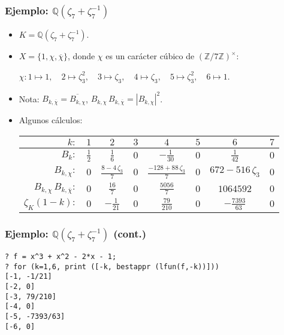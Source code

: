 \documentclass{beamer}
\newcommand{\ZZ}{\mathbb{Z}}
\newcommand{\QQ}{\mathbb{Q}}
\begin{document}
\begin{frame}
  \frametitle{Ejemplo: $\QQ (\zeta_7 + \zeta_7^{-1})$}

  \begin{itemize}
  \item<1-> $K = \QQ (\zeta_7 + \zeta_7^{-1})$.

  \item<2-> $X = \{ 1, \chi, \overline{\chi} \}$, donde $\chi$ es un carácter
    cúbico de $(\ZZ/7\ZZ)^\times$:

    $\chi\colon 1\mapsto 1, \quad
    2 \mapsto \zeta_3^2, \quad
    3 \mapsto \zeta_3, \quad
    4 \mapsto \zeta_3, \quad
    5 \mapsto \zeta_3^2, \quad
    6 \mapsto 1$.

  \item<3-> Nota: $B_{k,\overline{\chi}} = \overline{B_{k,\chi}}$,
    $B_{k,\chi}\,B_{k,\overline{\chi}} = |B_{k,\chi}|^2$.

  \item<4-> Algunos cálculos:

    \begin{center}\small
    \renewcommand{\arraystretch}{1.5}
    \begin{tabular}{rccccccc}
      \hline
      $k\colon$ & $1$ & $2$ & $3$ & $4$ & $5$ & $6$ & $7$ \\
      \hline
      $B_k\colon$ & $\frac{1}{2}$ & $\frac{1}{6}$ & $0$ & $-\frac{1}{30}$ & $0$ & $\frac{1}{42}$ & $0$ \\
      \hline
      $B_{k,\chi}\colon$ & $0$ & $\frac{8-4\,\zeta_3}{7}$ & $0$ & $\frac{-128 + 88\,\zeta_3}{7}$ & $0$ & $672 - 516\,\zeta_3$ & $0$ \\
      \hline
      $B_{k,\chi}\,B_{k,\overline{\chi}}\colon$ & $0$ & $\frac{16}{7}$ & $0$ & $\frac{5056}{7}$ & $0$ & $1064592$ & $0$ \\
      \hline
      $\zeta_K (1-k)\colon$ & $0$ & $-\frac{1}{21}$ & $0$ & $\frac{79}{210}$ & $0$ & $-\frac{7393}{63}$ & $0$ \\
      \hline
    \end{tabular}
  \end{center}
  \end{itemize}
\end{frame}


\begin{frame}[fragile]
  \frametitle{Ejemplo: $\QQ (\zeta_7 + \zeta_7^{-1})$ (cont.)}

  \begin{shaded}\small
\begin{verbatim}
? f = x^3 + x^2 - 2*x - 1;
? for (k=1,6, print ([-k, bestappr (lfun(f,-k))]))
[-1, -1/21]
[-2, 0]
[-3, 79/210]
[-4, 0]
[-5, -7393/63]
[-6, 0]
\end{verbatim}
\end{shaded}
\end{frame}
\end{document}
